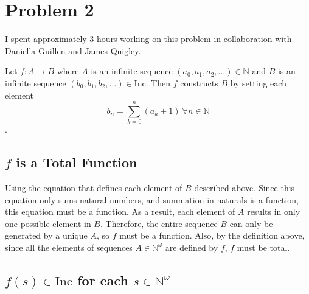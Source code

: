 \documentclass{article}
\begin{document}
\break

\section*{Problem 2}

I spent approximately 3 hours working on this problem in collaboration with
Daniella Guillen and James Quigley.

\bigbreak

Let $f: A \rightarrow B$ where $A$ is an infinite sequence $(a_{0}, a_{1},
a_{2}, \ldots) \in \mathbb{N}$ and $B$ is an infinite sequence $(b_{0}, b_{1},
b_{2}, \ldots) \in \mathrm{Inc}$. Then $f$ constructs $B$ by setting each
element
$$b_{n} = \sum_{k = 0}^{n} \left( a_{k} + 1\right) \ \forall n \in \mathbb{N}$$.

\subsection*{$f$ is a Total Function}

Using the equation that defines each element of $B$ described above.
Since this equation only sums natural numbers, and summation in naturals is a
function, this equation must be a function. As a result, each element of $A$
results in only one possible element in $B$. Therefore, the entire sequence $B$
can only be generated by a unique $A$, so $f$ must be a function. Also, by the
definition above, since all the elements of sequences $A \in
\mathbb{N}^{\omega}$ are defined by $f$, $f$ must be total.

\subsection*{$f(s) \in \mathrm{Inc}$ for each $s \in \mathbb{N}^{\omega}$}
\end{document}
